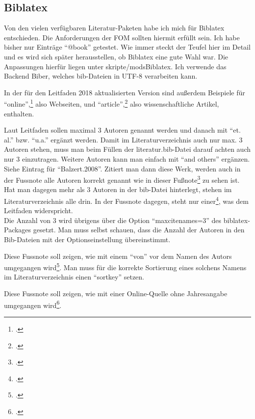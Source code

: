 
\subsection{Biblatex}
Von den vielen verfügbaren Literatur-Paketen habe ich mich für Biblatex entschieden. Die Anforderungen der FOM sollten hiermit erfüllt sein. Ich habe bisher nur Einträge \enquote{@book} getestet. Wie immer steckt der Teufel hier im Detail und es wird sich später herausstellen, ob Biblatex eine gute Wahl war. Die Anpassungen hierfür liegen unter skripte/modsBiblatex. Ich verwende das Backend Biber, welches bib-Dateien in UTF-8 verarbeiten kann.

In der für den Leitfaden 2018 aktualisierten Version sind außerdem Beispiele für \enquote{online},\footcite[Vgl.][]{website:angular:aboutAngular} also Webseiten, und \enquote{article},\footcite[Vgl.][S. 140]{Decker2009} also wissenschaftliche Artikel, enthalten.

Laut Leitfaden sollen maximal 3 Autoren genannt werden und danach mit
\enquote{et.
al.}
bzw. \enquote{u.a.} ergänzt werden. Damit im Literaturverzeichnis auch nur max.
3 Autoren stehen, muss man beim Füllen der literatur.bib-Datei darauf achten auch nur 3
einzutragen. Weitere Autoren kann man einfach mit \enquote{and others} ergänzen.
Siehe Eintrag für \enquote{Balzert.2008}. Zitiert man dann diese Werk, werden auch in
der Fussnote alle Autoren korrekt genannt wie in dieser
Fußnote\footcite[Vgl.][S.
1]{Balzert.2008} zu sehen ist.\\
Hat man dagegen mehr als 3 Autoren in der bib-Datei hinterlegt, stehen im
Literaturverzeichnis alle drin. In der Fussnote dagegen, steht nur
einer\footcite[Vgl.][S.
1]{Balzert2.2008}, was dem Leitfaden widerspricht.\\
Die Anzahl von 3 wird übrigens über die Option \enquote{maxcitenames=3} des
biblatex-Packages gesetzt. Man muss selbst schauen, dass die Anzahl der Autoren
in den Bib-Dateien mit der Optionseinstellung übereinstimmt.

Diese Fussnote soll zeigen, wie mit einem \enquote{von} vor dem Namen des Autors
umgegangen wird\footcite[Vgl.][S. 1]{Lucke2018}. Man muss für die korrekte
Sortierung eines solchens Namens im Literaturverzeichnis einen \enquote{sortkey}
setzen.

Diese Fussnote soll zeigen, wie mit einer Online-Quelle ohne Jahresangabe
umgegangen wird\footcite[Vgl.][]{Belastingdienst}.

